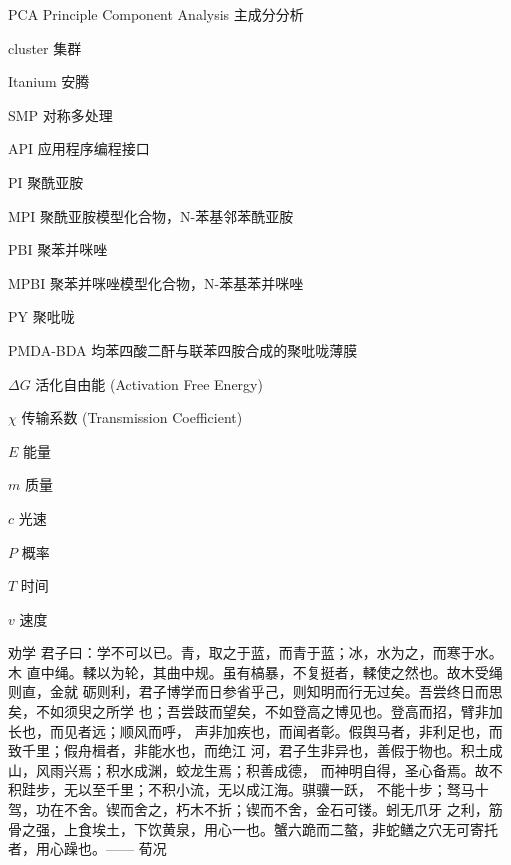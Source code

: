 \begin{denotation}[3cm]
\item[PCA] Principle Component Analysis 主成分分析
\item[cluster] 集群
\item[Itanium] 安腾
\item[SMP] 对称多处理
\item[API] 应用程序编程接口
\item[PI] 聚酰亚胺
\item[MPI] 聚酰亚胺模型化合物，N-苯基邻苯酰亚胺
\item[PBI] 聚苯并咪唑
\item[MPBI] 聚苯并咪唑模型化合物，N-苯基苯并咪唑
\item[PY] 聚吡咙
\item[PMDA-BDA]	均苯四酸二酐与联苯四胺合成的聚吡咙薄膜
\item[$\Delta G$] 活化自由能 (Activation Free Energy)
\item[$\chi$] 传输系数 (Transmission Coefficient)
\item[$E$] 能量
\item[$m$] 质量
\item[$c$] 光速
\item[$P$] 概率
\item[$T$] 时间
\item[$v$] 速度
\item[劝学] 君子曰：学不可以已。青，取之于蓝，而青于蓝；冰，水为之，而寒于水。木
  直中绳。輮以为轮，其曲中规。虽有槁暴，不复挺者，輮使之然也。故木受绳则直，金就
  砺则利，君子博学而日参省乎己，则知明而行无过矣。吾尝终日而思矣，不如须臾之所学
  也；吾尝跂而望矣，不如登高之博见也。登高而招，臂非加长也，而见者远；顺风而呼，
  声非加疾也，而闻者彰。假舆马者，非利足也，而致千里；假舟楫者，非能水也，而绝江
  河，君子生非异也，善假于物也。积土成山，风雨兴焉；积水成渊，蛟龙生焉；积善成德，
  而神明自得，圣心备焉。故不积跬步，无以至千里；不积小流，无以成江海。骐骥一跃，
  不能十步；驽马十驾，功在不舍。锲而舍之，朽木不折；锲而不舍，金石可镂。蚓无爪牙
  之利，筋骨之强，上食埃土，下饮黄泉，用心一也。蟹六跪而二螯，非蛇鳝之穴无可寄托
  者，用心躁也。—— 荀况
\end{denotation}

